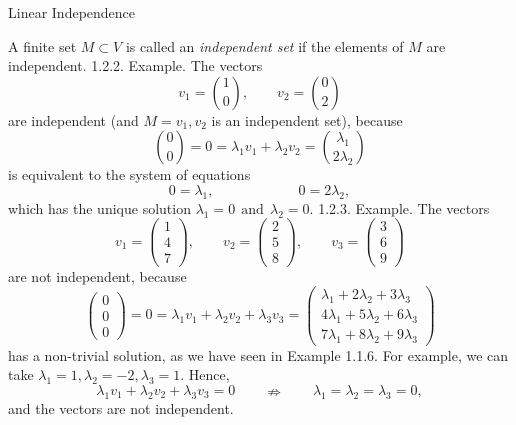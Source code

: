 \documentclass[smaller,hyperref={CJKbookmarks=true}]{beamer}
\begin{document}
\begin{frame}{Linear Independence}
\begin{spacing}{0.9}
A finite set $M\subset V$ is called an \emph{independent set} if the elements of $M$ are independent. \newpage
\alert{1.2.2. Example.} The vectors
\[v_1=\binom{1}{0},\qquad v_2=\binom{0}{2}\]
are independent (and $M={v_1,v_2}$ is an independent set), because
\[\binom{0}{0}=0=\lambda_1v_1+\lambda_2v_2=\binom{\lambda_1}{2\lambda_2}\]
is equivalent to the system of equations
\[0=\lambda_1,\qquad\qquad\qquad 0=2\lambda_2,\]
which has the unique solution $\lambda_1=0 ~~\text{and}~~ \lambda_2=0.$
\newpage
\alert{1.2.3. Example.} The vectors
\begin{equation*}
  v_1=\begin{pmatrix}1 \\4 \\7\end{pmatrix},\qquad v_2=\begin{pmatrix}
2 \\ 5 \\  8\end{pmatrix},\qquad
v_3=\begin{pmatrix}
3 \\ 6 \\  9\end{pmatrix}
\end{equation*}
are not independent, because
\begin{equation*}
  \begin{pmatrix}
0 \\0 \\0\end{pmatrix}=0=\lambda_1v_1+\lambda_2v_2+\lambda_3v_3=\begin{pmatrix}
\lambda_1+2\lambda_2+3\lambda_3 \\4\lambda_1+5\lambda_2+6\lambda_3 \\7\lambda_1+8\lambda_2+9\lambda_3
\end{pmatrix}
\end{equation*}
has a non-trivial solution, as we have seen in Example 1.1.6. For example, we can take $\lambda_1=1,\lambda_2=-2,\lambda_3=1.$ Hence,
\[\lambda_1v_1+\lambda_2v_2+\lambda_3v_3=0\qquad\nRightarrow\qquad
\lambda_1=\lambda_2=\lambda_3=0,\]
and the vectors are not independent.
\end{spacing}
\end{frame}
\end{document}
